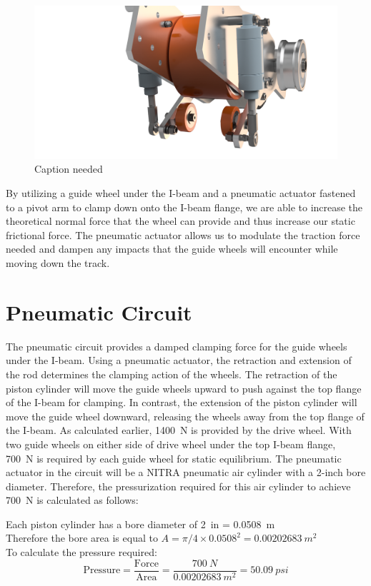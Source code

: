 \documentclass[main.tex]{subfiles}
\begin{document}
    \begin{figure}[H]
        \centering
        \includegraphics[width=\linewidth]{images/fig20}
        \caption{Caption needed}
    \end{figure}
    By utilizing a guide wheel under the I-beam and a pneumatic actuator fastened to a pivot arm to clamp down onto the I-beam flange, we are able to increase the theoretical normal force that the wheel can provide and thus increase our static frictional force. The pneumatic actuator allows us to modulate the traction force needed and dampen any impacts that the guide wheels will encounter while moving down the track.\\

    \section{Pneumatic Circuit}
	The pneumatic circuit provides a damped clamping force for the guide wheels under the I-beam. Using a pneumatic actuator, the retraction and extension of the rod determines the clamping action of the wheels. The retraction of the piston cylinder will move the guide wheels upward to push against the top flange of the I-beam for clamping. In contrast, the extension of the piston cylinder will move the guide wheel downward, releasing the wheels away from the top flange of the I-beam. As calculated earlier, \SI{1400}{N} is provided by the drive wheel. With two guide wheels on either side of drive wheel under the top I-beam flange, \SI{700}{N} is required by each guide wheel for static equilibrium. The pneumatic actuator in the circuit will be a NITRA pneumatic air cylinder with a 2-inch bore diameter. Therefore, the pressurization required for this air cylinder to achieve \SI{700}{N} is calculated as follows:\\

	\begin{center}
		Each piston cylinder has a bore diameter of \SI{2}{in} = \SI{0.0508}{m}\\
        Therefore the bore area is equal to $A = \pi/4 \times {0.0508^2} = \SI{0.00202683}{m^2}$ \\
        To calculate the pressure required:
        \[
      \textrm{Pressure} = \frac{\textrm{Force}}{\textrm{Area}} = \frac{\SI{700}{N}}{\SI{0.00202683}{m^2}} = \SI{50.09}{psi}
        \]
	\end{center}
    
\end{document}
